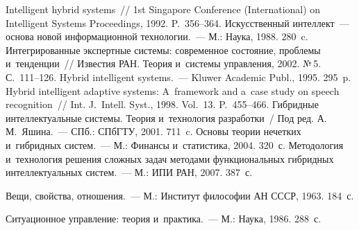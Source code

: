 \begin{multicols}{2}
{\small\frenchspacing
 {%
 \begin{thebibliography}{99}
 Intelligent hybrid systems~// 1st Singapore Conference 
(International) on Intelligent Systems Proceedings, 1992. P.~356--364.
 Искусственный интеллект~--- основа новой информационной 
технологии.~--- М.: Наука, 1988. 280~c.
 Интегрированные экспертные системы: современное состояние, 
проблемы и~тенденции~// Известия РАН. Теория и~системы управления, 2002. №\,5.  
С.~111--126.
 Hybrid intelligent systems.~--- Kluwer Academic Publ., 1995. 295~p.
 Hybrid intelligent adaptive systems: A~framework and a~case study 
on speech recognition~// Int. J.~Intell. Syst., 1998. Vol.~13. P.~455--466.
 Гибридные интеллектуальные сис\-те\-мы. Теория и~технология 
разработки~/ Под ред. А.\,М.~Яшина.~--- СПб.: СПбГТУ, 2001. 711~c.
 Основы теории нечетких и~гибридных систем.~--- М.: Финансы 
и~статистика, 2004. 320~с.
 Методология и~технология решения сложных задач 
методами функциональных гибридных интеллектуальных систем.~--- М.: ИПИ РАН, 2007. 
387~с.

 Вещи, свойства, отношения.~--- М.: Институт философии АН СССР, 1963. 
184~с.

 Ситуационное управление: теория и~практика.~--- М.: Наука, 
1986. 288~с.


\end{thebibliography}}}
\end{multicols}
